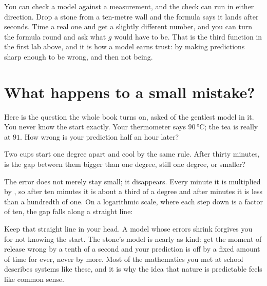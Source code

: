 \noindent
You can check a model against a measurement, and the check can run in either
direction. Drop a stone from a ten-metre wall and the formula says it lands
after  seconds. Time a real one and get a slightly
different number, and you can turn the formula round and ask what $g$ would
have to be. That is the third function in the first lab above, and it is how a model
earns trust: by making predictions sharp enough to be wrong, and then not
being.

\section{What happens to a small mistake?}
\label{sec:ch01-error}

\noindent
Here is the question the whole book turns on, asked of the gentlest model in
it. You never know the start exactly. Your thermometer says $90$\,°C; the tea
is really at $91$. How wrong is your prediction half an hour later?

\begin{think}
Two cups start one degree apart and cool by the same rule. After thirty
minutes, is the gap between them bigger than one degree, still one degree, or
smaller?
\end{think}



\noindent
The error does not merely stay small; it disappears. Every minute it is
multiplied by , so after ten minutes it is about a
third of a degree and after  minutes it is less than
a hundredth of one. On a logarithmic scale, where each step down is a factor
of ten, the gap falls along a straight line:


\noindent
Keep that straight line in your head. A model whose errors shrink forgives
you for not knowing the start. The stone's model is nearly as kind: get the
moment of release wrong by a tenth of a second and your prediction is off by
a fixed amount of time for ever, never by more. Most of the mathematics you
met at school describes systems like these, and it is why the idea that
nature is predictable feels like common sense.

